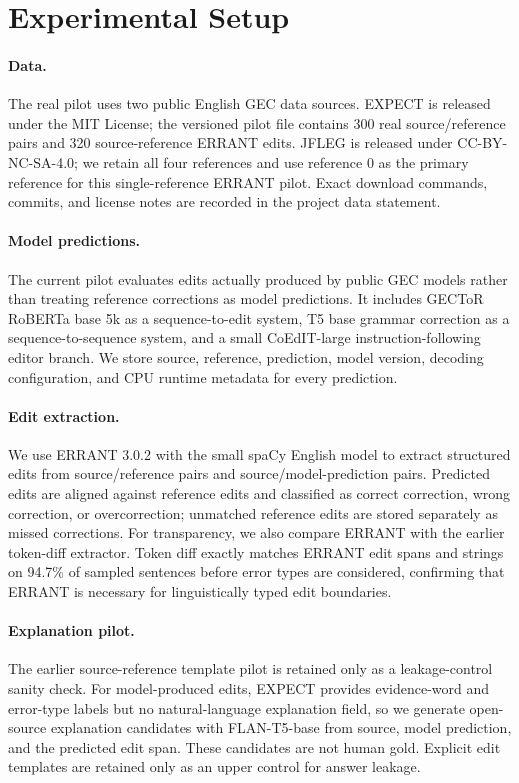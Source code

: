 \section{Experimental Setup}

\paragraph{Data.}
The real pilot uses two public English GEC data sources. EXPECT is released under the MIT License; the versioned pilot file contains 300 real source/reference pairs and 320 source-reference ERRANT edits. JFLEG is released under CC-BY-NC-SA-4.0; we retain all four references and use reference 0 as the primary reference for this single-reference ERRANT pilot. Exact download commands, commits, and license notes are recorded in the project data statement.

\paragraph{Model predictions.}
The current pilot evaluates edits actually produced by public GEC models rather than treating reference corrections as model predictions. It includes GECToR RoBERTa base 5k as a sequence-to-edit system, T5 base grammar correction as a sequence-to-sequence system, and a small CoEdIT-large instruction-following editor branch. We store source, reference, prediction, model version, decoding configuration, and CPU runtime metadata for every prediction.

\paragraph{Edit extraction.}
We use ERRANT 3.0.2 with the small spaCy English model to extract structured edits from source/reference pairs and source/model-prediction pairs. Predicted edits are aligned against reference edits and classified as correct correction, wrong correction, or overcorrection; unmatched reference edits are stored separately as missed corrections. For transparency, we also compare ERRANT with the earlier token-diff extractor. Token diff exactly matches ERRANT edit spans and strings on 94.7\% of sampled sentences before error types are considered, confirming that ERRANT is necessary for linguistically typed edit boundaries.

\paragraph{Explanation pilot.}
The earlier source-reference template pilot is retained only as a leakage-control sanity check. For model-produced edits, EXPECT provides evidence-word and error-type labels but no natural-language explanation field, so we generate open-source explanation candidates with FLAN-T5-base from source, model prediction, and the predicted edit span. These candidates are not human gold. Explicit edit templates are retained only as an upper control for answer leakage.

